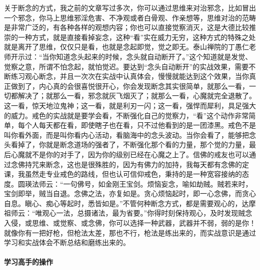 关于断念的方式，我之前的文章写过多次，你可以通过思维来对治邪念，比如冒出一个邪念，你马上思维邪淫危害、不净观或者白骨观、作亲想等，思维对治的范畴是非常广泛的，有各种各样的观想内容；你也可以直接觉察消灭，这是大德比较推崇的一种方式，就是直接看掉妄念，这种“看”实在威力无穷，这种方式的特殊之处就是离开了思维，仅仅只是看，也就是念起即觉，觉之即无。泰山禅院的丁愚仁老师开示过：“当你知道念头起来的时候，念头就自动断开了。”这个知道就是发觉、觉察之意，所谓不怕念起，就怕觉迟。要达到“念头自动断开”的实战效果，需要不断练习观心断念，并且一次次在实战中认真体会，慢慢就能达到这个效果，当你真正做到了，内心真的会很喜悦很开心，你会发现断念其实很简单，就那么一看，一切都解决了；就那么一看，邪念就灰飞烟灭了；就那么一看，心魔就完全退散了。这一看，惊天地泣鬼神；这一看，就是利刃一闪；这一看，强悍而犀利，具足强大的威力。戒色的实战就是要学会看，不断强化自己的觉察力，“看”这个动作非常简单，每个人每天都在看，即使瞎子也在看，只不过他看到的是一团漆黑。戒色不是叫你看外面，而是叫你看内心活动，看脑海中的念头波动。当你会看了，能够把念头看掉了，你就是断念道场的强者了，不断强化那个看的力量，那个觉的力量，最后心魔就不是你的对手了，因为你的级别已经在心魔之上了。信佛的戒友也可以通过念佛持咒来断念，这也是很殊胜的，因为有佛力的加持，我每天都有念佛的定课，我虽然走专业戒色的路线，但也认可信仰戒色，秉持的是一种宽容接纳的态度。圆瑛法师云：“一句佛号，如金刚王宝剑。烦恼妄念，喻如劫贼。贼若来时，宝剑即举，贼当自退。念佛之法，亦复如是。贪心烦恼起时，即一心念佛，而贪心自息。瞋心、痴心等起时，悉皆如是。”不管何种断念方式，都是需要观心的，达摩祖师云：“唯观心一法，总摄诸法，最为省要。”你得时刻保持观心，及时发现贼念入侵，或思维、或觉察、或念佛，你可以选择一种武器，武器并不弱，弱的是你！就像你有一把好枪，但枪法太差，那也不行，枪法是练出来的，而实战意识是通过学习和实战体会不断总结和磨练出来的。

\paragraph{学习高手的操作}


